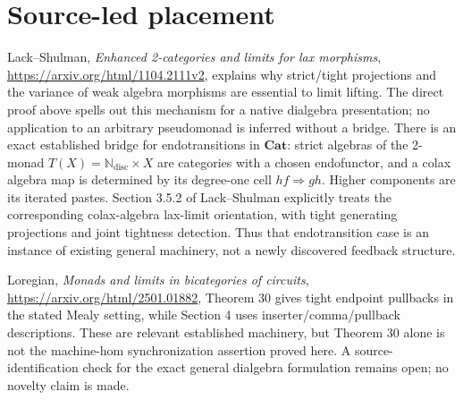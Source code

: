 \documentclass{article}
\begin{document}
\section{Source-led placement}
Lack--Shulman, \emph{Enhanced 2-categories and limits for lax morphisms}, \url{https://arxiv.org/html/1104.2111v2}, explains why strict/tight projections and the variance of weak algebra morphisms are essential to limit lifting. The direct proof above spells out this mechanism for a native dialgebra presentation; no application to an arbitrary pseudomonad is inferred without a bridge. There is an exact established bridge for endotransitions in $\mathbf{Cat}$: strict algebras of the 2-monad $T(X)=\mathbb N_{\mathrm{disc}}\times X$ are categories with a chosen endofunctor, and a colax algebra map is determined by its degree-one cell $hf\Rightarrow gh$. Higher components are its iterated pastes. Section 3.5.2 of Lack--Shulman explicitly treats the corresponding colax-algebra lax-limit orientation, with tight generating projections and joint tightness detection. Thus that endotransition case is an instance of existing general machinery, not a newly discovered feedback structure.

Loregian, \emph{Monads and limits in bicategories of circuits}, \url{https://arxiv.org/html/2501.01882}, Theorem 30 gives tight endpoint pullbacks in the stated Mealy setting, while Section 4 uses inserter/comma/pullback descriptions. These are relevant established machinery, but Theorem 30 alone is not the machine-hom synchronization assertion proved here. A source-identification check for the exact general dialgebra formulation remains open; no novelty claim is made.
\end{document}
